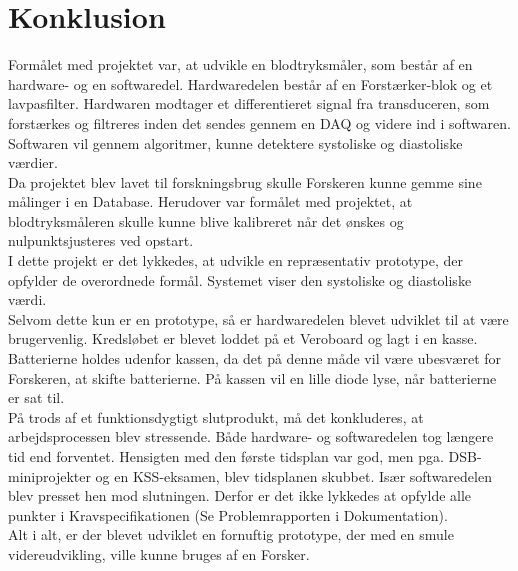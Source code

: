 \chapter{Konklusion}
Formålet med projektet var, at udvikle en blodtryksmåler, som består af en hardware- og en softwaredel. Hardwaredelen består af en Forstærker-blok og et lavpasfilter. Hardwaren modtager et differentieret signal fra transduceren, som forstærkes og filtreres inden det sendes gennem en DAQ og videre ind i softwaren. Softwaren vil gennem algoritmer, kunne detektere systoliske og diastoliske værdier.\\
Da projektet blev lavet til forskningsbrug skulle Forskeren kunne gemme sine målinger i en Database. Herudover var formålet med projektet, at blodtryksmåleren skulle kunne blive kalibreret når det ønskes og nulpunktsjusteres ved opstart. \\
I dette projekt er det lykkedes, at udvikle en repræsentativ prototype, der opfylder de overordnede formål. Systemet viser den systoliske og diastoliske værdi.\\
Selvom dette kun er en prototype, så er hardwaredelen blevet udviklet til at være brugervenlig. Kredsløbet er blevet loddet på et Veroboard og lagt i en kasse. Batterierne holdes udenfor kassen, da det på denne måde vil være ubesværet for Forskeren, at skifte batterierne. På kassen vil en lille diode lyse, når batterierne er sat til. \\
På trods af et funktionsdygtigt slutprodukt, må det konkluderes, at arbejdsprocessen blev stressende. Både hardware- og softwaredelen tog længere tid end forventet. Hensigten med den første tidsplan var god, men pga. DSB-miniprojekter og en KSS-eksamen, blev tidsplanen skubbet. Især softwaredelen blev presset hen mod slutningen. Derfor er det ikke lykkedes at opfylde alle punkter i Kravspecifikationen (Se Problemrapporten i Dokumentation). \\
Alt i alt, er der blevet udviklet en fornuftig prototype, der med en smule videreudvikling, ville kunne bruges af en Forsker.

